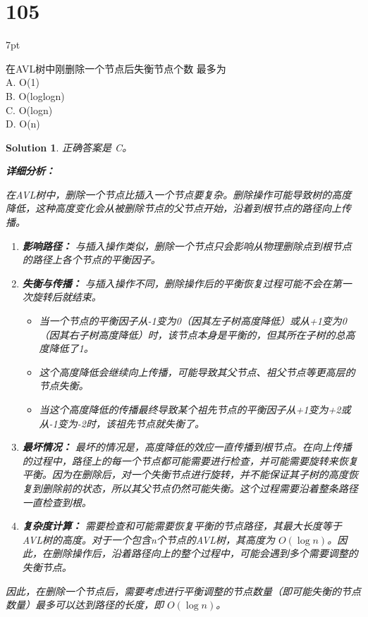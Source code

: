 \documentclass[UTF8]{report}
\newtheorem{solution}{Solution}
\theoremstyle{MyLineTheoremStyle} %
\theoremstyle{MyBlockTheoremStyle} %
\theoremstyle{MySubsubsectionStyle} %
\newenvironment{graybox}{%
        \def\FrameCommand{%
        \hspace{1pt}%
        {\color{gray}\small \vrule width 2pt}%
        {\color{graybox_color}\vrule width 4pt}%
        \colorbox{graybox_color}%
        }%
        \MakeFramed{\advance\hsize-\width\FrameRestore}%
        \noindent\hspace{-4.55pt}%
        \begin{adjustwidth}{}{7pt}%
        \vspace{2pt}\vspace{2pt}%
        }
        {%
        \vspace{2pt}\end{adjustwidth}\endMakeFramed%
        }
\begin{document}
\section*{105}
\begin{graybox}
在AVL树中刚删除一个节点后失衡节点个数
最多为 \\
A. O(1) \\
B. O(loglogn) \\
C. O(logn) \\
D. O(n)
\end{graybox}

\begin{solution}
正确答案是 C。

\textbf{详细分析：}

在AVL树中，删除一个节点比插入一个节点要复杂。删除操作可能导致树的高度降低，这种高度变化会从被删除节点的父节点开始，沿着到根节点的路径向上传播。

\begin{enumerate}
    \item \textbf{影响路径：} 与插入操作类似，删除一个节点只会影响从物理删除点到根节点的路径上各个节点的平衡因子。

    \item \textbf{失衡与传播：}
    与插入操作不同，删除操作后的平衡恢复过程可能不会在第一次旋转后就结束。
    \begin{itemize}
        \item 当一个节点的平衡因子从-1变为0（因其左子树高度降低）或从+1变为0（因其右子树高度降低）时，该节点本身是平衡的，但其所在子树的总高度降低了1。
        \item 这个高度降低会继续向上传播，可能导致其父节点、祖父节点等更高层的节点失衡。
        \item 当这个高度降低的传播最终导致某个祖先节点的平衡因子从+1变为+2或从-1变为-2时，该祖先节点就失衡了。
    \end{itemize}

    \item \textbf{最坏情况：}
    最坏的情况是，高度降低的效应一直传播到根节点。在向上传播的过程中，路径上的每一个节点都可能需要进行检查，并可能需要旋转来恢复平衡。因为在删除后，对一个失衡节点进行旋转，并不能保证其子树的高度恢复到删除前的状态，所以其父节点仍然可能失衡。这个过程需要沿着整条路径一直检查到根。

    \item \textbf{复杂度计算：}
    需要检查和可能需要恢复平衡的节点路径，其最大长度等于AVL树的高度。对于一个包含n个节点的AVL树，其高度为 $O(\log n)$。因此，在删除操作后，沿着路径向上的整个过程中，可能会遇到多个需要调整的失衡节点。
\end{enumerate}

因此，在删除一个节点后，需要考虑进行平衡调整的节点数量（即可能失衡的节点数量）最多可以达到路径的长度，即 $O(\log n)$。
\end{solution}
\end{document}

